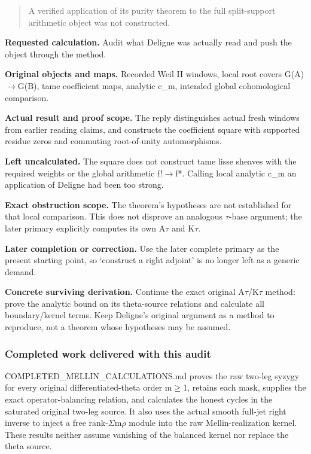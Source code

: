 \begin{quote}
A verified application of its purity theorem to the full split-support
arithmetic object was not constructed.
\end{quote}

\textbf{Requested calculation.} Audit what Deligne was actually read and
push the object through the method.

\textbf{Original objects and maps.} Recorded Weil II windows, local root
covers G(A)\allowbreak{}\ensuremath{→}\allowbreak{}G(B), tame
coefficient maps, analytic c\_m, intended global cohomological
comparison.

\textbf{Actual result and proof scope.} The reply distinguishes actual
fresh windows from earlier reading claims, and constructs the
coefficient square with supported residue zeros and commuting
root-of-unity automorphisms.

\textbf{Left uncalculated.} The square does not construct tame lisse
sheaves with the required weights or the global arithmetic
f!\allowbreak{}\ensuremath{→}\allowbreak{}f*. Calling local analytic
c\_m an application of Deligne had been too strong.

\textbf{Exact obstruction scope.} The theorem's hypotheses are not
established for that local comparison. This does not disprove an
analogous \allowbreak{}\ensuremath{τ}\allowbreak{}-base argument; the
later primary explicitly computes its own
A\allowbreak{}\ensuremath{τ}\allowbreak{} and
K\allowbreak{}\ensuremath{τ}\allowbreak{}.

\textbf{Later completion or correction.} Use the later complete primary
as the present starting point, so `construct a right adjoint' is no
longer left as a generic demand.

\textbf{Concrete surviving derivation.} Continue the exact original
A\allowbreak{}\ensuremath{τ}\allowbreak{}/K\allowbreak{}\ensuremath{τ}\allowbreak{}
method: prove the analytic bound on its theta-source relations and
calculate all boundary/kernel terms. Keep Deligne's original argument as
a method to reproduce, not a theorem whose hypotheses may be assumed.

\subsubsection{Completed work delivered with this
audit}\label{completed-work-delivered-with-this-audit}

COMPLETED\_MELLIN\_CALCULATIONS.md proves the raw two-leg syzygy for
every original differentiated-theta order
m\allowbreak{}\ensuremath{≥}\allowbreak{}1, retains each mask, supplies
the exact operator-balancing relation, and calculates the honest cycles
in the saturated original two-leg source. It also uses the actual smooth
full-jet right inverse to inject a free
rank-\allowbreak{}\ensuremath{Σ}\allowbreak{}m\allowbreak{}\ensuremath{ρ}\allowbreak{}
module into the raw Mellin-realization kernel. These results neither
assume vanishing of the balanced kernel nor replace the theta source.

